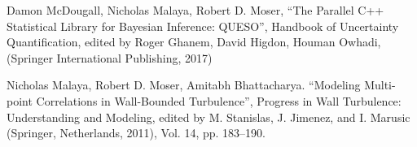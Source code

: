 
Damon McDougall, Nicholas Malaya, Robert D. Moser, ``The Parallel C++
Statistical Library for Bayesian Inference: QUESO'', Handbook of
Uncertainty Quantification, edited by Roger Ghanem, David Higdon, Houman
Owhadi, (Springer International Publishing, 2017) 

\blankline

Nicholas Malaya, Robert D. Moser, Amitabh Bhattacharya. ``Modeling
Multi-point Correlations in Wall-Bounded Turbulence'', Progress in Wall
Turbulence: Understanding and Modeling, edited by M. Stanislas,
J. Jimenez, and I. Marusic (Springer, Netherlands, 2011), Vol. 14,
pp. 183–190.  